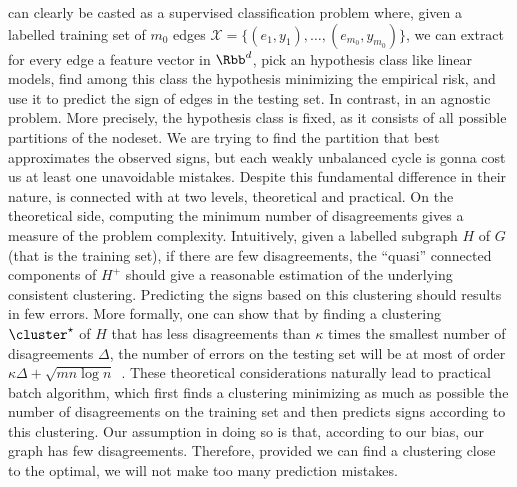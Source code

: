 \esp{} can clearly be casted as a supervised classification problem where, given a labelled training
set of $m_0$ edges $\mathcal{X}=\{(e_1, y_1), \ldots, (e_{m_0}, y_{m_0})\}$, we can extract for
every edge a feature vector in $\Rbb^d$, pick an hypothesis class like linear models, find among
this class the hypothesis minimizing the empirical risk, and use it to predict the sign of edges in
the testing set. In contrast, \pcc{} in an agnostic problem. More precisely, the hypothesis class is
fixed, as it consists of all possible partitions of the nodeset. We are trying to find the partition
that best approximates the observed signs, but each weakly unbalanced cycle is gonna cost us at
least one unavoidable mistakes. Despite this fundamental difference in their nature, \pcc{} is
connected with \esp{} at two levels, theoretical and practical. On the theoretical side, computing
the minimum number of disagreements gives a measure of the \esp{} problem complexity.  Intuitively,
given a labelled subgraph $H$ of $G$ (that is the training set), if there are few disagreements, the
\enquote{quasi} connected components of $H^+$ should give a reasonable estimation of the underlying
consistent clustering. Predicting the signs based on this clustering should results in few errors.
More formally, one can show that by finding a clustering $\cluster^\star$ of $H$ that has less
disagreements than $\kappa$ times the smallest number of disagreements $\Delta$, the number of
errors on the testing set will be at most of order $\kappa\Delta + \sqrt{mn\log
n}$~\autocite[Theorem 6]{Cesa-Bianchi2012b}. These theoretical considerations naturally lead to
practical batch algorithm, which first finds a clustering minimizing as much as possible the number
of disagreements on the training set and then predicts signs according to this clustering. Our
assumption in doing so is that, according to our bias, our graph has few disagreements. Therefore,
provided we can find a clustering close to the optimal, we will not make too many prediction
mistakes.

\bigskip

